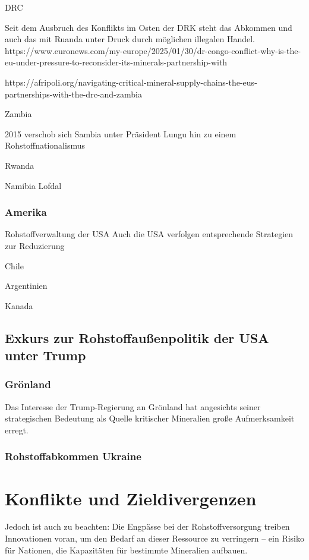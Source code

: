 \documentclass[12pt,a4paper,oneside]{book} %
\begin{document}
DRC

Seit dem Ausbruch des Konflikts im Osten der DRK steht das Abkommen und auch das mit Ruanda unter Druck durch möglichen illegalen Handel.
https://www.euronews.com/my-europe/2025/01/30/dr-congo-conflict-why-is-the-eu-under-pressure-to-reconsider-its-minerals-partnership-with

https://afripoli.org/navigating-critical-mineral-supply-chains-the-eus-partnerships-with-the-drc-and-zambia

Zambia

2015 verschob sich Sambia unter Präsident Lungu hin zu einem Rohstoffnationalismus 

Rwanda

Namibia
Lofdal 






\subsubsection{Amerika}
Rohstoffverwaltung der USA
Auch die USA verfolgen entsprechende Strategien zur Reduzierung 



Chile

Argentinien

Kanada

\subsection{Exkurs zur Rohstoffaußenpolitik der USA unter Trump}

\subsubsection{Grönland}

Das Interesse der Trump-Regierung an Grönland hat angesichts seiner strategischen Bedeutung als Quelle kritischer Mineralien große Aufmerksamkeit erregt.

\subsubsection{Rohstoffabkommen Ukraine}



\section{Konflikte und Zieldivergenzen}

Jedoch ist auch zu beachten: Die Engpässe bei der Rohstoffversorgung treiben Innovationen voran, um den Bedarf an dieser Ressource zu verringern – ein Risiko für Nationen, die Kapazitäten für bestimmte Mineralien aufbauen.
\end{document}
